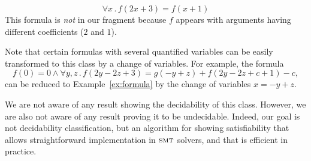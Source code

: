 \documentclass[runningheads]{llncs}
\newcommand{\smt}{\textsc{smt}}
\newcommand{\todoSN}[1]{\todo[color=orange!50]{#1 -SN}}
\begin{document}
\begin{example}[Invalid]
  \[\forall x \,.\, f(2x+3) = f(x+1)\]
  This formula is \emph{not} in our fragment because $f$ appears with arguments having different coefficients ($2$ and $1$).
\end{example}

Note that certain formulas with several quantified variables can be easily transformed to this class by a change of variables. For example, the formula
\[f(0)=0 \wedge \forall y,z \,.\, f(2y-2z+3)=g(-y+z)+f(2y-2z+c+1)-c,\]
can be reduced to Example~\ref{ex:formula} by the change of variables $x=-y+z$.

We are not aware of any result showing the decidability of this class. However, we are also not aware of any result proving it to be undecidable. Indeed, our goal is not decidability classification, but an algorithm for showing satisfiability that allows straightforward implementation in $\smt$ solvers, and that is efficient in practice.




\end{document}
